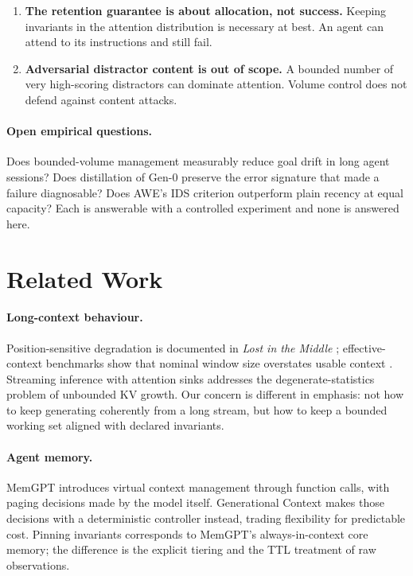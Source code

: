 ﻿\documentclass[11pt,a4paper]{article}
\theoremstyle{plain}
\theoremstyle{definition}
\theoremstyle{remark}
\begin{document}
\begin{enumerate}
  \item \textbf{The retention guarantee is about allocation, not success.}
        Keeping invariants in the attention distribution is necessary at best.
        An agent can attend to its instructions and still fail.

  \item \textbf{Adversarial distractor content is out of scope.} A bounded
        number of very high-scoring distractors can dominate attention. Volume
        control does not defend against content attacks.
\end{enumerate}

\paragraph{Open empirical questions.}
Does bounded-volume management measurably reduce goal drift in long agent
sessions? Does distillation of Gen-0 preserve the error signature that made a
failure diagnosable? Does AWE's IDS criterion outperform plain recency at equal
capacity? Each is answerable with a controlled experiment and none is answered
here.

\section{Related Work}
\label{sec:related}

\paragraph{Long-context behaviour.} Position-sensitive degradation is documented
in \emph{Lost in the Middle} \cite{liu2023lost}; effective-context benchmarks
show that nominal window size overstates usable context \cite{hsieh2024ruler}.
Streaming inference with attention sinks \cite{xiao2023streamingllm} addresses
the degenerate-statistics problem of unbounded KV growth. Our concern is
different in emphasis: not how to keep generating coherently from a long stream,
but how to keep a bounded working set aligned with declared invariants.

\paragraph{Agent memory.} MemGPT \cite{packer2023memgpt} introduces virtual
context management through function calls, with paging decisions made by the
model itself. Generational Context makes those decisions with a deterministic
controller instead, trading flexibility for predictable cost. Pinning invariants
corresponds to MemGPT's always-in-context core memory; the difference is the
explicit tiering and the TTL treatment of raw observations.
\end{document}

